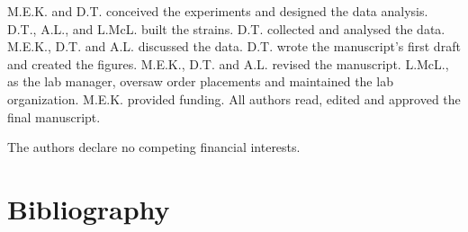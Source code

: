 \documentclass[times, twoside]{zHenriquesLab-StyleBioRxiv}
\begin{document}
\begin{contributions}
    M.E.K. and D.T. conceived the experiments and designed the data analysis. D.T., A.L., and L.McL. built the strains. D.T. collected and analysed the data. M.E.K., D.T. and A.L. discussed the data. D.T. wrote the manuscript's first draft and created the figures. M.E.K., D.T. and A.L. revised the manuscript. L.McL., as the lab manager, oversaw order placements and maintained the lab organization. M.E.K. provided funding. All authors read, edited and approved the final manuscript.
\end{contributions}

\begin{interests}
    The authors declare no competing financial interests.
\end{interests}

\section*{Bibliography}


\onecolumn
\newpage


\end{document}
